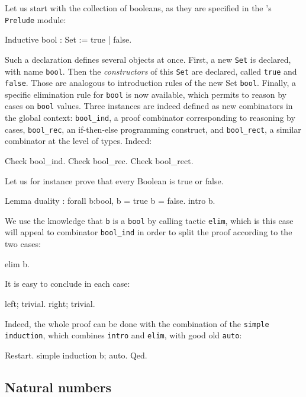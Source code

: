 \documentclass[11pt,a4paper]{book}
\begin{document}
Let us start with the collection of booleans, as they are specified
in the \Coq's \verb:Prelude: module: 
\begin{coq_example}
Inductive bool :  Set := true | false.
\end{coq_example}

Such a declaration defines several objects at once. First, a new
\verb:Set: is declared, with name \verb:bool:. Then the {\sl constructors}
of this \verb:Set: are declared, called \verb:true: and \verb:false:.
Those are analogous to introduction rules of the new Set \verb:bool:.
Finally, a specific elimination rule for \verb:bool: is now available, which
permits to reason by cases on \verb:bool: values. Three instances are
indeed defined as new combinators in the global context: \verb:bool_ind:,
a proof combinator corresponding to reasoning by cases,
\verb:bool_rec:, an if-then-else programming construct,
and \verb:bool_rect:, a similar combinator at the level of types.
Indeed:
\begin{coq_example}
Check bool_ind.
Check bool_rec.
Check bool_rect.
\end{coq_example}

Let us for instance prove that every Boolean is true or false.
\begin{coq_example}
Lemma duality : forall b:bool, b = true \/ b = false.
intro b.
\end{coq_example}

We use the knowledge that \verb:b: is a \verb:bool: by calling tactic
\verb:elim:, which is this case will appeal to combinator \verb:bool_ind:
in order to split the proof according to the two cases:
\begin{coq_example}
elim b.
\end{coq_example}

It is easy to conclude in each case:
\begin{coq_example}
left; trivial.
right; trivial.
\end{coq_example}

Indeed, the whole proof can be done with the combination of the
 \verb:simple: \verb:induction:, which combines \verb:intro: and \verb:elim:,
with good old \verb:auto::
\begin{coq_example}
Restart.
simple induction b; auto.
Qed.
\end{coq_example}

\subsection{Natural numbers}
\end{document}

